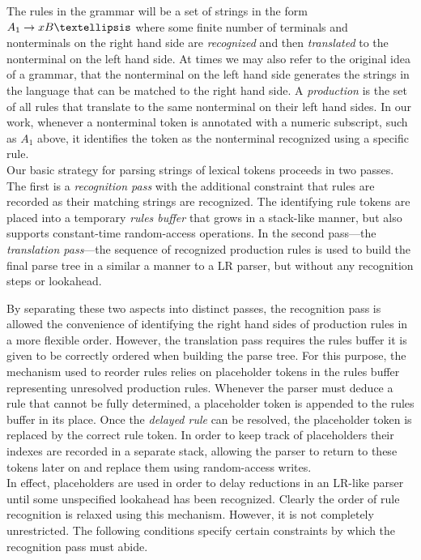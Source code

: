 \documentclass[a4paper,11pt]{article}
\begin{document}
The rules in the grammar will be a set of strings in the form $A_1 \rightarrow x B \textellipsis$ where some finite number of terminals and nonterminals on the right hand side are \emph{recognized} and then \emph{translated} to the nonterminal on the left hand side.
At times we may also refer to the original idea of a grammar, that the nonterminal on the left hand side generates the strings in the language that can be matched to the right hand side.
A \emph{production} is the set of all rules that translate to the same nonterminal on their left hand sides.
In our work, whenever a nonterminal token is annotated with a numeric subscript, such as $A_1$ above, it identifies the token as the nonterminal recognized using a specific rule.\\

Our basic strategy for parsing strings of lexical tokens proceeds in two passes.
The first is a \emph{recognition pass} with the additional constraint that rules are recorded as their matching strings are recognized.
The identifying rule tokens are placed into a temporary \emph{rules buffer} that grows in a stack-like manner, but also supports constant-time random-access operations.
In the second pass---the \emph{translation pass}---the sequence of recognized production rules is used to build the final parse tree in a similar a manner to a LR parser, but without any recognition steps or lookahead.

By separating these two aspects into distinct passes, the recognition pass is allowed the convenience of identifying the right hand sides of production rules in a more flexible order. 
However, the translation pass requires the rules buffer it is given to be correctly ordered when building the parse tree.
For this purpose, the mechanism used to reorder rules relies on placeholder tokens in the rules buffer representing unresolved production rules.
Whenever the parser must deduce a rule that cannot be fully determined, a placeholder token is appended to the rules buffer in its place. 
Once the \emph{delayed rule} can be resolved, the placeholder token is replaced by the correct rule token.
In order to keep track of placeholders their indexes are recorded in a separate stack, allowing the parser to return to these tokens later on and replace them using random-access writes.\\

In effect, placeholders are used in order to delay reductions in an LR-like parser until some unspecified lookahead has been recognized.
Clearly the order of rule recognition is relaxed using this mechanism.
However, it is not completely unrestricted.
The following conditions specify certain constraints by which the recognition pass must abide.
\end{document}

